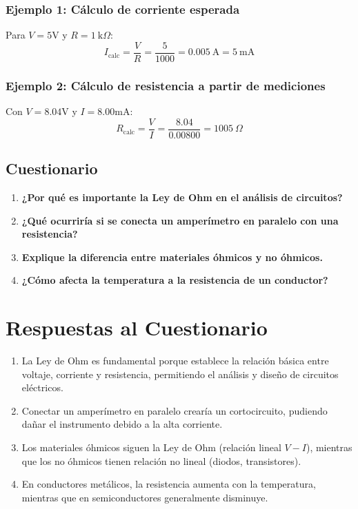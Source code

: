 \documentclass[12pt]{article}
\begin{document}
\subsubsection{Ejemplo 1: Cálculo de corriente esperada}
Para $V = 5$V y $R = 1\ \text{k}\Omega$:
\[
I_{\text{calc}} = \frac{V}{R} = \frac{5}{1000} = 0.005\ \text{A} = 5\ \text{mA}
\]

\subsubsection{Ejemplo 2: Cálculo de resistencia a partir de mediciones}
Con $V = 8.04$V y $I = 8.00$mA:
\[
R_{\text{calc}} = \frac{V}{I} = \frac{8.04}{0.00800} = 1005\ \Omega
\]

\subsection{Cuestionario}
\begin{enumerate}
    \item \textbf{¿Por qué es importante la Ley de Ohm en el análisis de circuitos?}
    \vspace{0.5cm}
    
    \item \textbf{¿Qué ocurriría si se conecta un amperímetro en paralelo con una resistencia?}
    \vspace{0.5cm}
    
    \item \textbf{Explique la diferencia entre materiales óhmicos y no óhmicos.}
    \vspace{0.5cm}
    
    \item \textbf{¿Cómo afecta la temperatura a la resistencia de un conductor?}
    \vspace{0.5cm}
\end{enumerate}

\section*{Respuestas al Cuestionario}
\begin{enumerate}
    \item La Ley de Ohm es fundamental porque establece la relación básica entre voltaje, corriente y resistencia, permitiendo el análisis y diseño de circuitos eléctricos.
    
    \item Conectar un amperímetro en paralelo crearía un cortocircuito, pudiendo dañar el instrumento debido a la alta corriente.
    
    \item Los materiales óhmicos siguen la Ley de Ohm (relación lineal $V-I$), mientras que los no óhmicos tienen relación no lineal (diodos, transistores).
    
    \item En conductores metálicos, la resistencia aumenta con la temperatura, mientras que en semiconductores generalmente disminuye.
\end{enumerate}
\end{document}
